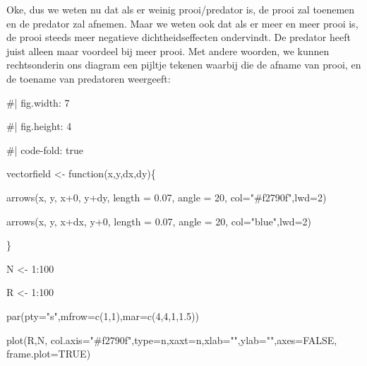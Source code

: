\documentclass[
  a4paper,
]{scrbook}
\newenvironment{Shaded}{\begin{snugshade}}{\end{snugshade}}
\newcommand{\AttributeTok}[1]{\textcolor[rgb]{0.40,0.45,0.13}{#1}}
\newcommand{\CommentTok}[1]{\textcolor[rgb]{0.37,0.37,0.37}{#1}}
\newcommand{\ConstantTok}[1]{\textcolor[rgb]{0.56,0.35,0.01}{#1}}
\newcommand{\ControlFlowTok}[1]{\textcolor[rgb]{0.00,0.23,0.31}{#1}}
\newcommand{\DecValTok}[1]{\textcolor[rgb]{0.68,0.00,0.00}{#1}}
\newcommand{\FloatTok}[1]{\textcolor[rgb]{0.68,0.00,0.00}{#1}}
\newcommand{\FunctionTok}[1]{\textcolor[rgb]{0.28,0.35,0.67}{#1}}
\newcommand{\NormalTok}[1]{\textcolor[rgb]{0.00,0.23,0.31}{#1}}
\newcommand{\OtherTok}[1]{\textcolor[rgb]{0.00,0.23,0.31}{#1}}
\newcommand{\SpecialCharTok}[1]{\textcolor[rgb]{0.37,0.37,0.37}{#1}}
\newcommand{\StringTok}[1]{\textcolor[rgb]{0.13,0.47,0.30}{#1}}
\theoremstyle{definition}
\theoremstyle{remark}
\begin{document}
Oke, dus we weten nu dat als er weinig prooi/predator is, de prooi zal
toenemen en de predator zal afnemen. Maar we weten ook dat als er meer
en meer prooi is, de prooi steeds meer negatieve dichtheidseffecten
ondervindt. De predator heeft juist alleen maar voordeel bij meer prooi.
Met andere woorden, we kunnen rechtsonderin ons diagram een pijltje
tekenen waarbij die de afname van prooi, en de toename van predatoren
weergeeft:

\begin{Shaded}
\begin{Highlighting}[]
\CommentTok{\#| fig.width: 7}

\CommentTok{\#| fig.height: 4}

\CommentTok{\#| code{-}fold: true}

\NormalTok{vectorfield }\OtherTok{\textless{}{-}} \ControlFlowTok{function}\NormalTok{(x,y,dx,dy)\{}

  \FunctionTok{arrows}\NormalTok{(x, y, x}\SpecialCharTok{+}\DecValTok{0}\NormalTok{, y}\SpecialCharTok{+}\NormalTok{dy, }\AttributeTok{length =} \FloatTok{0.07}\NormalTok{, }\AttributeTok{angle =} \DecValTok{20}\NormalTok{, }\AttributeTok{col=}\StringTok{"\#f2790f"}\NormalTok{,}\AttributeTok{lwd=}\DecValTok{2}\NormalTok{)}

  \FunctionTok{arrows}\NormalTok{(x, y, x}\SpecialCharTok{+}\NormalTok{dx, y}\SpecialCharTok{+}\DecValTok{0}\NormalTok{, }\AttributeTok{length =} \FloatTok{0.07}\NormalTok{, }\AttributeTok{angle =} \DecValTok{20}\NormalTok{, }\AttributeTok{col=}\StringTok{"blue"}\NormalTok{,}\AttributeTok{lwd=}\DecValTok{2}\NormalTok{)}

\NormalTok{\}}

\NormalTok{N }\OtherTok{\textless{}{-}} \DecValTok{1}\SpecialCharTok{:}\DecValTok{100}

\NormalTok{R }\OtherTok{\textless{}{-}} \DecValTok{1}\SpecialCharTok{:}\DecValTok{100}

\FunctionTok{par}\NormalTok{(}\AttributeTok{pty=}\StringTok{"s"}\NormalTok{,}\AttributeTok{mfrow=}\FunctionTok{c}\NormalTok{(}\DecValTok{1}\NormalTok{,}\DecValTok{1}\NormalTok{),}\AttributeTok{mar=}\FunctionTok{c}\NormalTok{(}\DecValTok{4}\NormalTok{,}\DecValTok{4}\NormalTok{,}\DecValTok{1}\NormalTok{,}\FloatTok{1.5}\NormalTok{))}

\FunctionTok{plot}\NormalTok{(R,N,  }\AttributeTok{col.axis=}\StringTok{"\#f2790f"}\NormalTok{,}\AttributeTok{type=}\StringTok{\textquotesingle{}n\textquotesingle{}}\NormalTok{,}\AttributeTok{xaxt=}\StringTok{\textquotesingle{}n\textquotesingle{}}\NormalTok{,}\AttributeTok{xlab=}\StringTok{""}\NormalTok{,}\AttributeTok{ylab=}\StringTok{""}\NormalTok{,}\AttributeTok{axes=}\ConstantTok{FALSE}\NormalTok{, }\AttributeTok{frame.plot=}\ConstantTok{TRUE}\NormalTok{)}


\end{Highlighting}
\end{Shaded}
\end{document}
